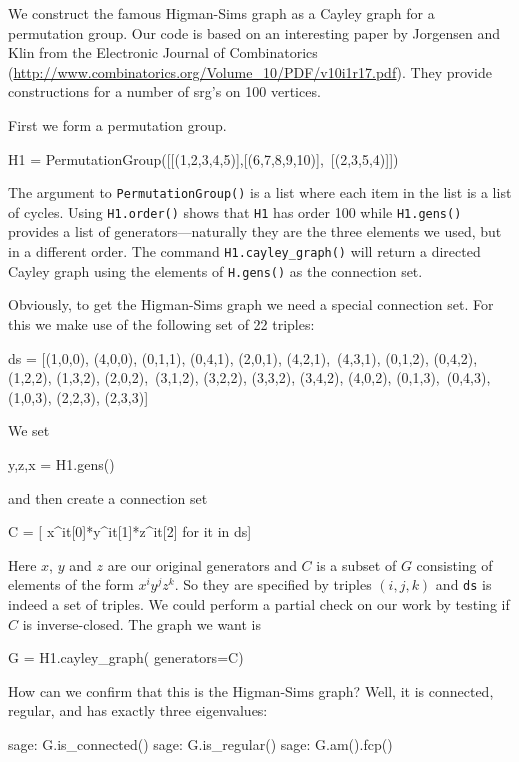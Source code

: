 We construct the famous Higman-Sims graph as a Cayley graph for a permutation
group. Our code is based on an interesting paper by Jorgensen and Klin
from the Electronic Journal of Combinatorics
(\url{http://www.combinatorics.org/Volume_10/PDF/v10i1r17.pdf}).
They provide constructions for a number of srg's on 100 vertices.

First we form a permutation group.
\begin{sageblock}
    H1 = PermutationGroup([[(1,2,3,4,5)],[(6,7,8,9,10)],\
      [(2,3,5,4)]])
\end{sageblock}
The argument to \texttt{PermutationGroup()} is a list where each item in the
list is a list of cycles. Using \verb|H1.order()| shows that \verb|H1| has 
order 100 while \verb|H1.gens()| provides a list of generators---naturally they 
are the three elements we used, but in a different order.
The command \verb|H1.cayley_graph()| will return a directed Cayley graph using
the elements of \verb|H.gens()| as the connection set.

Obviously, to get the Higman-Sims graph we need a special connection set.
For this we make use of the following set of 22 triples:
\begin{sageblock}
ds = [(1,0,0), (4,0,0), (0,1,1), (0,4,1), (2,0,1), (4,2,1),\
  (4,3,1), (0,1,2), (0,4,2), (1,2,2), (1,3,2), (2,0,2),\
  (3,1,2), (3,2,2), (3,3,2), (3,4,2), (4,0,2), (0,1,3),\
  (0,4,3), (1,0,3), (2,2,3), (2,3,3)]
\end{sageblock}
We set
\begin{sageblock}
    y,z,x = H1.gens()
\end{sageblock}
and then create a connection set
\begin{sageblock}
    C = [ x^it[0]*y^it[1]*z^it[2] for it in ds]
\end{sageblock}
Here $x$, $y$ and $z$ are our original generators and $C$ is a subset
of $G$ consisting of elements of the form $x^iy^jz^k$. So they are
specified by triples $(i,j,k)$ and \verb|ds| is indeed a set of triples.
We could perform a partial check on our work by testing if $C$ is inverse-closed.
The graph we want is
\begin{sageblock}
    G = H1.cayley_graph( generators=C)
\end{sageblock}

How can we confirm that this is the Higman-Sims graph?  Well, it is connected,
regular, and has exactly three eigenvalues:

\begin{sageexample}
    sage: G.is_connected()
    sage: G.is_regular()
    sage: G.am().fcp()
\end{sageexample}


